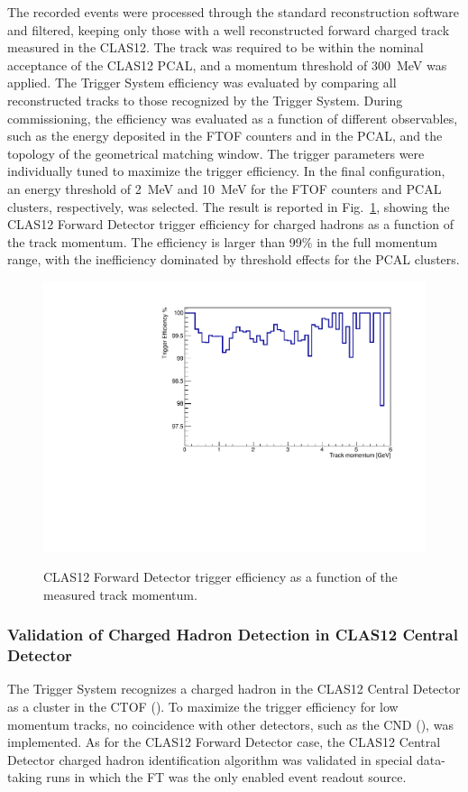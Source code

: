 The recorded events were processed through the standard reconstruction software and filtered, keeping only those with a well reconstructed forward charged track measured in the CLAS12. The track was required to be within the nominal acceptance of the CLAS12 PCAL, and a momentum threshold of 300~MeV was applied. The Trigger System efficiency was evaluated by comparing all reconstructed tracks to those recognized by the Trigger System. During commissioning, the efficiency was evaluated as a function of different observables, such as the energy deposited in the FTOF counters and in the PCAL, and the topology of the geometrical matching window. The trigger parameters were individually tuned to maximize the trigger efficiency. In the final configuration, an energy threshold of 2~MeV and 10~MeV for the FTOF counters and PCAL clusters, respectively, was selected. The result is reported in Fig.~\ref{fig:FD_TrackEfficiency}, showing the CLAS12 Forward Detector trigger efficiency for charged hadrons as a function of the track momentum. The efficiency is larger than 99$\%$ in the full momentum range, with the inefficiency dominated by threshold effects for the PCAL clusters.

\begin{figure}[!htb]
 \centering
{\includegraphics[width=.5\textwidth]{img/FD_TrackEfficiency.pdf}}
 \caption{CLAS12 Forward Detector trigger efficiency as a function of the measured track momentum.}
 \label{fig:FD_TrackEfficiency}
\end{figure}

\subsubsection{Validation of Charged Hadron Detection in CLAS12 Central Detector}

The Trigger System recognizes a charged hadron in the CLAS12 Central Detector as a cluster in the CTOF (\cite{ctof-ref}). To maximize the trigger efficiency for low momentum tracks, no coincidence with other detectors, such as the CND (\cite{cnd-ref}), was implemented. As for the CLAS12 Forward Detector case, the CLAS12 Central Detector charged hadron identification algorithm was validated in special data-taking runs in which the FT was the only enabled event readout source. 

